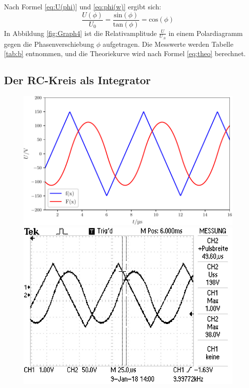 \noindent Nach Formel \eqref{eq:U(phi)} und \eqref{eq:phi(w)} ergibt sich:
\begin{equation}
\frac{U(\phi)}{U_0}=\frac{\mathrm{sin}(\phi)}{\mathrm{tan}(\phi)}=\mathrm{cos}(\phi) \label{eq:theo}
\end{equation}
In Abbildung \ref{fig:Graph4} ist die Relativamplitude $\frac{U}{U_.0}$ in einem Polardiagramm gegen die Phasenverschiebung $\phi$ aufgetragen. Die Messwerte werden Tabelle \ref{tab:b} entnommen, und die Theoriekurve wird nach Formel \eqref{eq:theo} berechnet. 

\subsection{Der RC-Kreis als Integrator}
\begin{figure}
\centering
\begin{minipage}{0.48\textwidth}
\centering
\includegraphics[width=\linewidth-10pt,height=\textheight-10pt,keepaspectratio]{content/images/Graph5.pdf}
\end{minipage}
\begin{minipage}{0.48\textwidth}
\centering
\includegraphics[width=\linewidth-10pt,height=\textheight-10pt,keepaspectratio]{content/images/5.jpg}
\end{minipage}


\end{figure}
